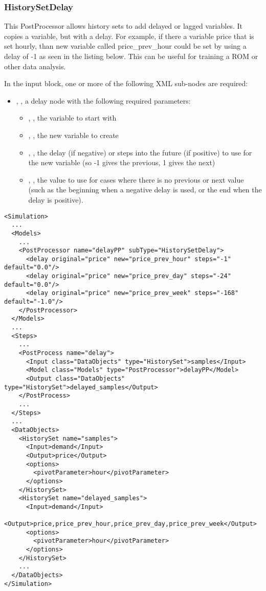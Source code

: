 \subsubsection{HistorySetDelay}
\label{HistorySetDelay}

This PostProcessor allows history sets to add delayed or lagged
variables. It copies a variable, but with a delay. For example, if
there a variable price that is set hourly, than new variable called
price\_prev\_hour could be set by using a delay of -1 as seen in the
listing below.  This can be useful for training a ROM or other data
analysis.


In the  input block, one or more of the following XML sub-nodes are required:

\begin{itemize}
\item {}, , a delay node with the following required parameters:
  \begin{itemize}
  \item {}, , the variable to start with
  \item {}, , the new variable to create
  \item {}, , the delay (if negative) or steps into the future (if positive) to use for the new variable (so -1 gives the previous, 1 gives the next)
  \item {}, , the value to use for cases where there is no previous or next value (such as the beginning when a negative delay is used, or the end when the delay is positive).
  \end{itemize}
\end{itemize}

\begin{lstlisting}[style=XML]
<Simulation>
  ...
  <Models>
    ...
    <PostProcessor name="delayPP" subType="HistorySetDelay">
      <delay original="price" new="price_prev_hour" steps="-1" default="0.0"/>
      <delay original="price" new="price_prev_day" steps="-24" default="0.0"/>
      <delay original="price" new="price_prev_week" steps="-168" default="-1.0"/>
    </PostProcessor>
  </Models>
  ...
  <Steps>
    ...
    <PostProcess name="delay">
      <Input class="DataObjects" type="HistorySet">samples</Input>
      <Model class="Models" type="PostProcessor">delayPP</Model>
      <Output class="DataObjects" type="HistorySet">delayed_samples</Output>
    </PostProcess>
    ...
  </Steps>
  ...
  <DataObjects>
    <HistorySet name="samples">
      <Input>demand</Input>
      <Output>price</Output>
      <options>
        <pivotParameter>hour</pivotParameter>
      </options>
    </HistorySet>
    <HistorySet name="delayed_samples">
      <Input>demand</Input>
      <Output>price,price_prev_hour,price_prev_day,price_prev_week</Output>
      <options>
        <pivotParameter>hour</pivotParameter>
      </options>
    </HistorySet>
    ...
  </DataObjects>
</Simulation>
\end{lstlisting}

